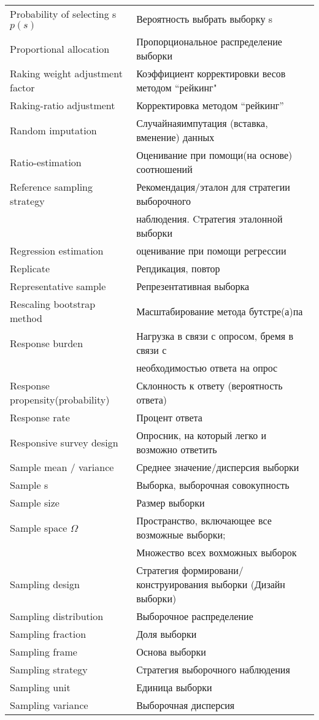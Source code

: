 \documentclass[12pt]{article}
\begin{document}
\begin{center}
\begin{tabular}{l|l}
Probability of selecting s $p(s)$& Вероятность выбрать выборку s \\
Proportional allocation & Пропорциональное распределение выборки\\
Raking weight adjustment factor& Коэффициент корректировки весов методом ``рейкинг"\\
Raking-ratio adjustment & Корректировка методом ``рейкинг”\\
Random imputation & Случайнаяимпутация (вставка, вменение) данных\\
Ratio-estimation & Оценивание при помощи(на основе) соотношений\\
Reference sampling strategy & Рекомендация/эталон для стратегии выборочного \\& наблюдения. Cтратегия эталонной выборки\\
Regression estimation & оценивание при помощи регрессии\\
Replicate & Репдикация, повтор\\
Representative sample & Репрезентативная выборка\\
Rescaling bootstrap method & Масштабирование метода бутстре(а)па\\
Response burden & Нагрузка в связи с опросом, бремя в связи с \\ & необходимостью ответа на опрос\\
Response propensity(probability) & Склонность к ответу (вероятность ответа)\\
Response rate & Процент ответа\\
Responsive survey design & Опросник, на который легко и возможно ответить\\
Sample mean / variance & Среднее значение/дисперсия выборки \\
Sample s& Выборка, выборочная совокупность\\
Sample size & Размер выборки\\
Sample space $\Omega$& Пространство, включающее все возможные выборки; \\& Множество всех вохможных выборок\\
Sampling design & Стратегия формировани/конструирования выборки (Дизайн выборки)\\
Sampling distribution & Выборочное распределение \\
Sampling fraction & Доля выборки \\
Sampling frame & Основа выборки\\
Sampling strategy & Стратегия выборочного наблюдения\\
Sampling unit & Единица выборки\\
Sampling variance & Выборочная дисперсия \\
\hline
\end{tabular}
\end{center}
\end{document}
